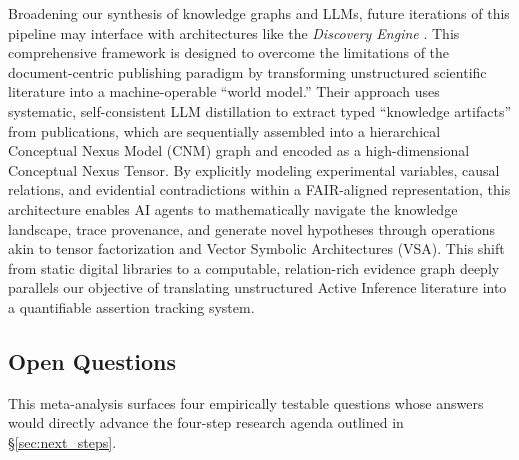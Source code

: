 \documentclass[
  english,
]{article}
\begin{document}
{{{{{{{{{{{{{{{{Broadening our synthesis of knowledge graphs and LLMs, future iterations
of this pipeline may interface with architectures like the
\emph{Discovery Engine} \citep{baulin2025discovery}. This comprehensive
framework is designed to overcome the limitations of the
document-centric publishing paradigm by transforming unstructured
scientific literature into a machine-operable ``world model.'' Their
approach uses systematic, self-consistent LLM distillation to extract
typed ``knowledge artifacts'' from publications, which are sequentially
assembled into a hierarchical Conceptual Nexus Model (CNM) graph and
encoded as a high-dimensional Conceptual Nexus Tensor. By explicitly
modeling experimental variables, causal relations, and evidential
contradictions within a FAIR-aligned representation, this architecture
enables AI agents to mathematically navigate the knowledge landscape,
trace provenance, and generate novel hypotheses through operations akin
to tensor factorization and Vector Symbolic Architectures (VSA). This
shift from static digital libraries to a computable, relation-rich
evidence graph deeply parallels our objective of translating
unstructured Active Inference literature into a quantifiable assertion
tracking system.

\subsection{Open Questions}\label{open-questions}

This meta-analysis surfaces four empirically testable questions whose
answers would directly advance the four-step research agenda outlined in
\S\ref{sec:next_steps}.

}}}}}}}}}}}}}}}}
\end{document}
